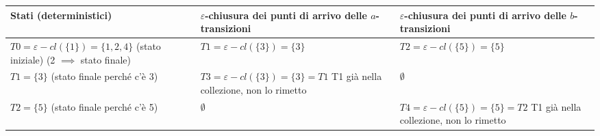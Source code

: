 \documentclass{standalone}
\providecommand\lightrule{%
	\arrayrulecolor{black!30}%
	\midrule[\lightrulewidth]%
	\arrayrulecolor{black}}
\begin{document}
\begin{tabularx}{\textwidth}{X|X|X}
    Stati (deterministici) & \(\varepsilon\)-chiusura dei punti di arrivo delle \(a\)-transizioni & \(\varepsilon\)-chiusura dei punti di arrivo delle \(b\)-transizioni \\
    \midrule
        \(T0 = \varepsilon-cl(\{1\}) = \{1,2,4\}\) \newline
        (stato iniziale) \newline
        (2 \(\implies\) stato finale)
        &
        \(T1 = \varepsilon-cl(\{3\}) = \{3\} \) \newline
        [T1 unmarked]
        &
        \(T2 = \varepsilon-cl(\{5\}) = \{5\}\) \newline 
        [T2 unmarked]
        \\ \lightrule
        \(T1 = \{3\}\) \newline
        (stato finale perché c’è 3)
        &
        \(T3 = \varepsilon-cl(\{3\}) = \{3\} = T1\) \newline
        T1 già nella collezione, non lo rimetto
        &
        \(\emptyset\)
        \\ \lightrule
        \(T2 = \{5\}\) \newline
        (stato finale perché c’è 5)
        &
        \(\emptyset\)
        &
        \(T4 = \varepsilon-cl(\{5\}) = \{5\} = T2\)
        T1 già nella collezione, non lo rimetto
        \\
\end{tabularx}
\end{document}
